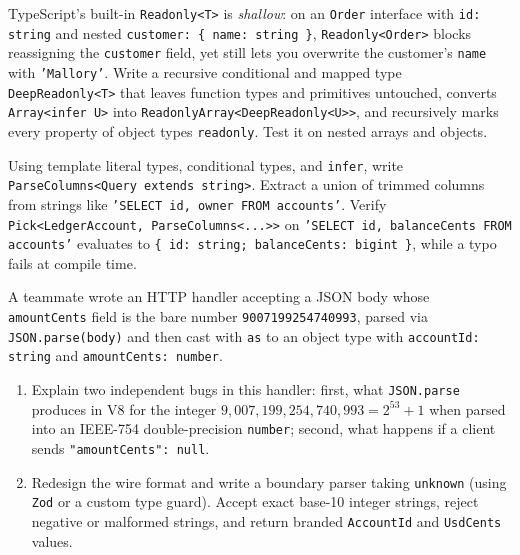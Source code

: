\begin{exercise}
\label{ex:ch09-deep-readonly}
TypeScript's built-in \texttt{Readonly<T>} is \emph{shallow}: on an \texttt{Order} interface with \texttt{id: string} and nested \texttt{customer: \{ name: string \}}, \texttt{Readonly<Order>} blocks reassigning the \texttt{customer} field, yet still lets you overwrite the customer's \texttt{name} with \texttt{'Mallory'}.
Write a recursive conditional and mapped type \texttt{DeepReadonly<T>} that leaves function types and primitives untouched, converts \texttt{Array<infer U>} into \texttt{ReadonlyArray<\allowbreak{}DeepReadonly<U>>}, and recursively marks every property of object types \texttt{readonly}. Test it on nested arrays and objects.
\end{exercise}

\begin{exercise}
\label{ex:ch09-template-infer}
Using template literal types, conditional types, and \texttt{infer}, write \texttt{ParseColumns<Query extends string>}. Extract a union of trimmed columns from strings like \texttt{'SELECT id, owner FROM accounts'}. Verify \texttt{Pick<LedgerAccount, ParseColumns<...>>} on \texttt{'SELECT id, balanceCents FROM accounts'} evaluates to \texttt{\{ id: string; balanceCents: bigint \}}, while a typo fails at compile time.
\end{exercise}

\begin{exercise}
\label{ex:ch09-ieee754-boundary}
A teammate wrote an HTTP handler accepting a JSON body whose \texttt{amountCents} field is the bare number \texttt{9007199254740993}, parsed via \texttt{JSON.parse(body)} and then cast with \texttt{as} to an object type with \texttt{accountId: string} and \texttt{amountCents: number}.
\begin{enumerate}
  \item Explain two independent bugs in this handler: first, what \texttt{JSON.parse} produces in V8 for the integer $9{,}007{,}199{,}254{,}740{,}993 = 2^{53} + 1$ when parsed into an IEEE-754 double-precision \texttt{number}; second, what happens if a client sends \texttt{"amountCents": null}.
  \item Redesign the wire format and write a boundary parser taking \texttt{unknown} (using \texttt{Zod} or a custom type guard). Accept exact base-10 integer strings, reject negative or malformed strings, and return branded \texttt{AccountId} and \texttt{UsdCents} values.
\end{enumerate}
\end{exercise}
